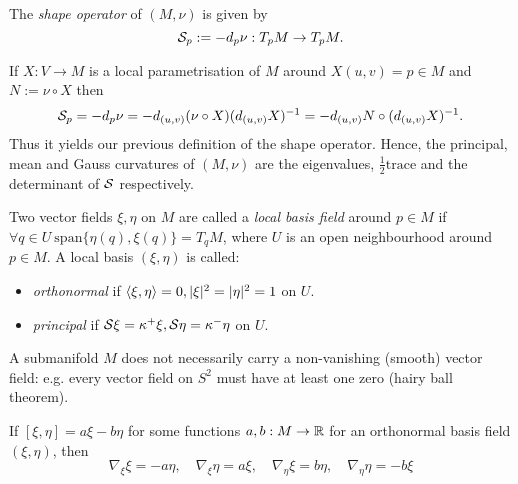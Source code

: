 \begin{definition}
	
	The \emph{shape operator} of $ (M,\nu) $ is given by	
		\[ \mathcal S_p := -d_p\nu:T_pM \rightarrow T_pM . \]
	
	
\end{definition}

\begin{remark}
	If $ X:V \rightarrow M $ is a local parametrisation of $ M $ around $ X(u,v)=p \in M $ and $ N:= \nu \circ X $ then 
		\[ \mathcal S_p = -d_p\nu = - d_{(u,v)}(\nu \circ X)(d_{(u,v)}X)^{-1} = -d_{(u,v)}N \circ (d_{(u,v)}X)^{-1}. \]
	Thus it yields our previous definition of the shape operator. Hence, the principal, mean and Gauss curvatures of $ (M,\nu) $ are the eigenvalues, $ \frac{1}{2} \mathrm{trace} $ and the determinant of $ \mathcal S $ respectively.
\end{remark}

\begin{definition}
	
	Two vector fields $ \xi,\eta $ on $ M $ are called a \emph{local basis field} around $ p \in M $ if $ \forall q \in U ~ \mathrm{span}\{ \eta(q), \xi(q) \} = T_qM$, where $ U $ is an open neighbourhood around $ p \in M $.
	A local basis $ (\xi,\eta) $ is called:
	\begin{itemize}
		\item \emph{orthonormal} if $ \left \langle \xi,\eta \right\rangle = 0, |\xi|^2 = |\eta|^2 = 1 $ on $ U $.
		\item \emph{principal} if $ \mathcal S\xi = \kappa^+\xi, \mathcal S\eta = \kappa^-\eta $ on $ U $.
	\end{itemize} 
	
\end{definition}

\begin{remark}
	
	A submanifold $ M $ does not necessarily carry a non-vanishing (smooth) vector field: e.g. every vector field on $ S^2 $ must have at least one zero (hairy ball theorem).
	
\end{remark}

\begin{lemma}
	If $ [\xi,\eta]=a\xi - b\eta $ for some functions $ a,b:M \rightarrow \mathbb R $ for an orthonormal basis field $ (\xi,\eta) $, then
		\[ \nabla_\xi \xi = - a\eta, \quad \nabla_\xi \eta = a\xi, \quad \nabla_\eta \xi =  b\eta, \quad \nabla_\eta \eta = - b\xi \]
\end{lemma}

